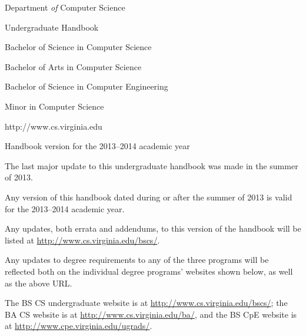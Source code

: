 \documentclass[10pt,letter]{book}
\begin{document}
\pagestyle{empty}

\vspace*{0.5in}

\begin{figure}[h!]
\begin{center}
\end{center}
\end{figure}

\vspace{0.25in}

\begin{center}
{\huge Department {\em of} Computer Science}

{\huge Undergraduate Handbook}

\vspace{1in}

{\Large Bachelor of Science in Computer Science}

{\Large Bachelor of Arts in Computer Science}

{\Large Bachelor of Science in Computer Engineering}

{\Large Minor in Computer Science}

\vspace{1in}

{\large http://www.cs.virginia.edu}

{\large Handbook version for the 2013--2014 academic year}
\end{center}


\clearpage

\vspace*{1.5in}

\begin{center}
\parbox{3in} {The last major update to this undergraduate handbook was
  made in the summer of 2013.
\newline

Any version of this handbook dated during or after the summer
of 2013 is valid for the 2013--2014 academic year.
\newline

Any updates, both errata and addendums, to this version of the
handbook will be listed at \url{http://www.cs.virginia.edu/bscs/}.
\newline

Any updates to degree requirements to any of the three programs will
be reflected both on the individual degree programs' websites shown
below, as well as the above URL.
\newline

The BS CS undergraduate website is at
\url{http://www.cs.virginia.edu/bscs/}; the BA CS website is at
\url{http://www.cs.virginia.edu/ba/}, and the BS CpE website is at
\url{http://www.cpe.virginia.edu/ugrads/}.
\newline

}
\end{center}
\end{document}
